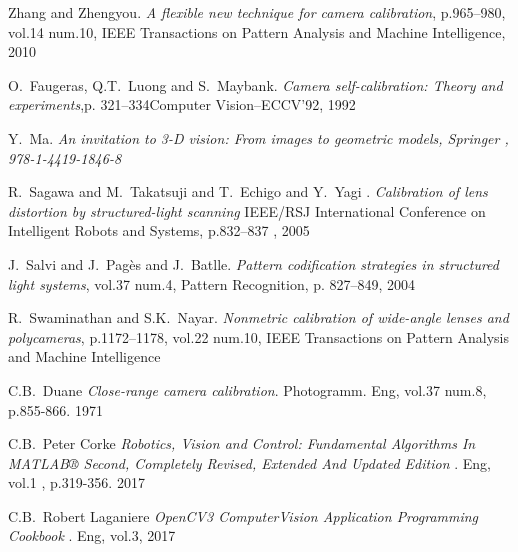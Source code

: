 \documentclass[journal,final,a4paper,twoside]{PS}
\begin{document}
\begin{thebibliography}{1}
Zhang and Zhengyou. \emph{A flexible new technique for camera calibration}, p.965--980, vol.14 num.10, IEEE Transactions on Pattern Analysis and Machine Intelligence, 2010


O.~Faugeras, Q.T.~Luong and S.~Maybank. \emph{Camera self-calibration: Theory and experiments},p. 321--334Computer Vision--ECCV'92, 1992

Y.~Ma. \emph{{An invitation to 3-D vision: From images to geometric models}, {Springer} , {978-1-4419-1846-8}}

R.~Sagawa and M.~Takatsuji and T.~Echigo and Y.~Yagi . \emph{Calibration of lens distortion by structured-light scanning} IEEE/RSJ International Conference on Intelligent Robots and Systems, p.832--837 , 2005

J.~Salvi and J.~Pag{\`e}s and J.~Batlle. \emph{Pattern codification strategies in structured light systems}, vol.37 num.4, Pattern Recognition, p. 827--849, 2004

R.~Swaminathan and S.K.~Nayar. \emph{Nonmetric calibration of wide-angle lenses and polycameras}, p.1172--1178, vol.22 num.10, IEEE Transactions on Pattern Analysis and Machine Intelligence


C.B.~Duane  \emph{Close-range camera calibration}. Photogramm. Eng, vol.37 num.8, p.855-866. 1971

C.B.~Peter Corke  \emph{Robotics, Vision and Control: Fundamental Algorithms In MATLAB® Second, Completely Revised, Extended And Updated Edition }. Eng, vol.1 , p.319-356. 2017

C.B.~Robert Laganiere  \emph{OpenCV3 ComputerVision Application Programming Cookbook }. Eng, vol.3, 2017


\end{thebibliography}
\end{document}
